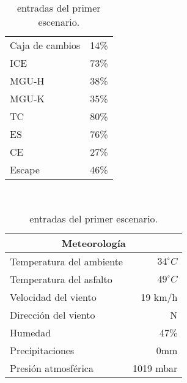 \documentclass[12pt,a4paper,twoside,spanish]{article}      %
\begin{document}
\begin{table}[H]
\begin{tabular}{lr}
        Caja de cambios & 14\% \\
        ICE & 73\% \\
        MGU-H & 38\% \\
        MGU-K & 35\% \\
        TC & 80\% \\
        ES & 76\% \\
        CE & 27\% \\
        Escape & 46\% \\ \bottomrule
    \end{tabular} \\ \vspace{1em}
    \begin{tabular}{lr}
        \toprule
        \multicolumn{2}{c}{\textbf{Meteorología}} \\ \midrule
        Temperatura del ambiente & $34^\circ C$ \\
        Temperatura del asfalto & $49^\circ C$ \\
        Velocidad del viento & 19 km/h \\
        Dirección del viento & N \\
        Humedad & 47\% \\
        Precipitaciones & 0mm \\
        Presión atmosférica & 1019 mbar \\ \bottomrule
    \end{tabular} \\ \vspace{1em}
    \caption{entradas del primer escenario.}
    \label{tab:in_esc_1}
\end{table}
\end{document}
